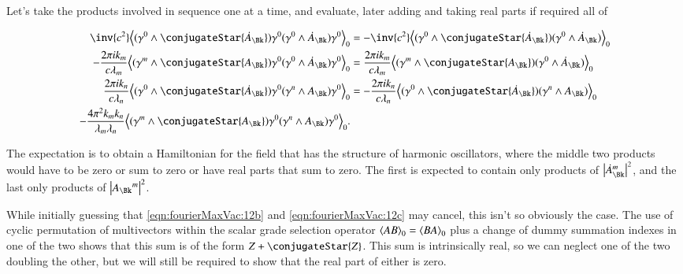 Let's take the products involved in sequence one at a time, and evaluate, later adding and taking real parts if required all of

\begin{subequations}
\label{eqn:fourierMaxVac:12}
\begin{align}
\inv{c^2}
\gpgradezero{ (\gamma^0 \wedge \conjugateStar{\dot{A}_{\Bk}} ) \gamma^0 (\gamma^0 \wedge \dot{A}_\Bk) \gamma^0 } &=
-\inv{c^2}
\gpgradezero{ (\gamma^0 \wedge \conjugateStar{\dot{A}_{\Bk}} ) (\gamma^0 \wedge \dot{A}_\Bk) } 
\label{eqn:fourierMaxVac:12a}
\\
- \frac{2 \pi i k_m}{c \lambda_m} 
\gpgradezero{ 
(\gamma^m \wedge \conjugateStar{A_{\Bk}} ) \gamma^0 ( \gamma^0 \wedge \dot{A}_\Bk ) \gamma^0
} 
&=
\frac{2 \pi i k_m}{c \lambda_m} 
\gpgradezero{ 
(\gamma^m \wedge \conjugateStar{A_{\Bk}} ) ( \gamma^0 \wedge \dot{A}_\Bk ) 
} 
\label{eqn:fourierMaxVac:12b}
\\
\frac{2 \pi i k_n}{c \lambda_n} 
\gpgradezero{ 
( \gamma^0 \wedge \conjugateStar{\dot{A}_{\Bk}} ) \gamma^0 ( \gamma^n \wedge A_\Bk ) \gamma^0
} 
&=
-\frac{2 \pi i k_n}{c \lambda_n} 
\gpgradezero{ 
( \gamma^0 \wedge \conjugateStar{\dot{A}_{\Bk}} ) ( \gamma^n \wedge A_\Bk ) 
} 
\label{eqn:fourierMaxVac:12c}
\\
-\frac{4 \pi^2 k_m k_n}{\lambda_m \lambda_n}
\gpgradezero{ 
(\gamma^m \wedge \conjugateStar{A_{\Bk}} ) \gamma^0
(\gamma^n \wedge A_\Bk ) \gamma^0
}. &
\label{eqn:fourierMaxVac:12d}
\end{align}
\end{subequations}

The expectation is to obtain a Hamiltonian for the field that has the structure of harmonic oscillators, where the middle two products would have to be zero or sum to zero or have real parts that sum to zero.  The first is expected to contain only products of $\Abs{{\dot{A}_\Bk}^m}^2$, and the last only products of $\Abs{{A_\Bk}^m}^2$.

While initially guessing that \autoref{eqn:fourierMaxVac:12b} and \autoref{eqn:fourierMaxVac:12c} may cancel, this isn't so obviously the case.  The use of cyclic permutation of multivectors within the scalar grade selection operator ${\left\langle{{A B}}\right\rangle}_{0} = {\left\langle{{B A}}\right\rangle}_{0}$ plus a change of dummy summation indexes in one of the two shows that this sum is of the form $Z + \conjugateStar{Z}$.  This sum is intrinsically real, so we can neglect one of the two doubling the other, but we will still be required to show that the real part of either is zero.

